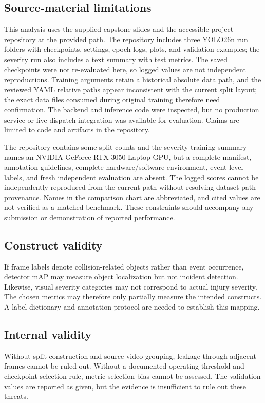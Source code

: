\documentclass[12pt,a4paper]{article}
\begin{document}
\subsection{Source-material limitations}
This analysis uses the supplied capstone slides and the accessible project repository at the provided path. The repository includes three YOLO26n run folders with checkpoints, settings, epoch logs, plots, and validation examples; the severity run also includes a text summary with test metrics. The saved checkpoints were not re-evaluated here, so logged values are not independent reproductions. Training arguments retain a historical absolute data path, and the reviewed YAML relative paths appear inconsistent with the current split layout; the exact data files consumed during original training therefore need confirmation. The backend and inference code were inspected, but no production service or live dispatch integration was available for evaluation. Claims are limited to code and artifacts in the repository.

The repository contains some split counts and the severity training summary names an NVIDIA GeForce RTX 3050 Laptop GPU, but a complete manifest, annotation guidelines, complete hardware/software environment, event-level labels, and fresh independent evaluation are absent. The logged scores cannot be independently reproduced from the current path without resolving dataset-path provenance. Names in the comparison chart are abbreviated, and cited values are not verified as a matched benchmark. These constraints should accompany any submission or demonstration of reported performance.

\subsection{Construct validity}
If frame labels denote collision-related objects rather than event occurrence, detector mAP may measure object localization but not incident detection. Likewise, visual severity categories may not correspond to actual injury severity. The chosen metrics may therefore only partially measure the intended constructs. A label dictionary and annotation protocol are needed to establish this mapping.

\subsection{Internal validity}
Without split construction and source-video grouping, leakage through adjacent frames cannot be ruled out. Without a documented operating threshold and checkpoint selection rule, metric selection bias cannot be assessed. The validation values are reported as given, but the evidence is insufficient to rule out these threats.
\end{document}

